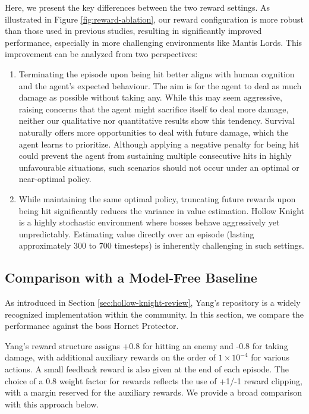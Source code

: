 Here, we present the key differences between the two reward settings.
As illustrated in Figure \ref{fig:reward-ablation}, our reward configuration is more robust than those used in previous studies, resulting in significantly improved performance, especially in more challenging environments like Mantis Lords.
This improvement can be analyzed from two perspectives:
\begin{enumerate}
    \item Terminating the episode upon being hit better aligns with human cognition and the agent's expected behaviour.
    The aim is for the agent to deal as much damage as possible without taking any.
    While this may seem aggressive, raising concerns that the agent might sacrifice itself to deal more damage, neither our qualitative nor quantitative results show this tendency.
    Survival naturally offers more opportunities to deal with future damage, which the agent learns to prioritize.
    Although applying a negative penalty for being hit could prevent the agent from sustaining multiple consecutive hits in highly unfavourable situations, such scenarios should not occur under an optimal or near-optimal policy.
    \item While maintaining the same optimal policy, truncating future rewards upon being hit significantly reduces the variance in value estimation.
    Hollow Knight is a highly stochastic environment where bosses behave aggressively yet unpredictably.
    Estimating value directly over an episode (lasting approximately 300 to 700 timesteps) is inherently challenging in such settings.
\end{enumerate}


\subsection{Comparison with a Model-Free Baseline} \label{sec:model-free-comparison}

As introduced in Section \ref{sec:hollow-knight-review}, Yang's repository \citep{yang_seermerhollowknight_rl_2023} is a widely recognized implementation within the community.
In this section, we compare the performance against the boss Hornet Protector.

Yang's reward structure assigns +0.8 for hitting an enemy and -0.8 for taking damage, with additional auxiliary rewards on the order of $1 \times 10^{-4}$ for various actions. A small feedback reward is also given at the end of each episode. 
The choice of a 0.8 weight factor for rewards reflects the use of +1/-1 reward clipping, with a margin reserved for the auxiliary rewards.
We provide a broad comparison with this approach below.

